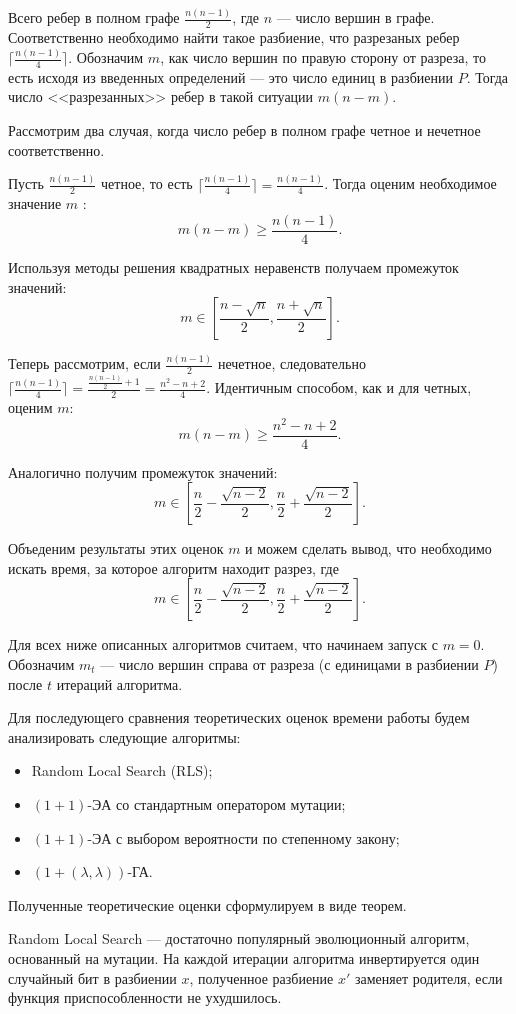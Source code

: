 \documentclass[times]{itmo-student-thesis}
\newcommand{\alglambdaf}{${(1 + (\lambda , \lambda))}$-ГА\xspace}
\newcommand{\oea}{\mbox{$(1 + 1)$-ЭА}\xspace}
\begin{document}
Всего ребер в полном графе $\frac{n(n-1)}{2}$, где $n$ --- число вершин в графе.
Соответственно необходимо найти такое разбиение, что разрезаных ребер $\lceil \frac{n(n-1)}{4} \rceil$.
Обозначим $m$, как число вершин по правую сторону от разреза, то есть исходя из введенных определений --- это число единиц в разбиении $P$.
Тогда число <<разрезанных>> ребер в такой ситуации $m(n-m)$.

Рассмотрим два случая, когда число ребер в полном графе четное и нечетное соответственно.

Пусть $\frac{n(n-1)}{2}$ четное, то есть $\lceil \frac{n(n-1)}{4} \rceil = \frac{n(n-1)}{4}$.
Тогда оценим необходимое значение $m$ :
$$
  m(n-m) \ge \frac{n(n-1)}{4}.
$$

Используя методы решения квадратных неравенств получаем промежуток значений:
$$
m \in \left[\frac{n - \sqrt{n}}{2}, \frac{n + \sqrt{n}}{2}\right].
$$

Теперь рассмотрим, если $\frac{n(n-1)}{2}$ нечетное, следовательно $\lceil \frac{n(n-1)}{4} \rceil = \frac{\frac{n(n-1)}{2}+1}{2} = \frac{n^2-n+2}{4}$.
Идентичным способом, как и для четных, оценим $m$:
$$
  m(n-m) \ge \frac{n^2-n+2}{4}.
$$

Аналогично получим промежуток значений:
$$
m \in \left[\frac{n}{2} -\frac{\sqrt{n-2}}{2},  \frac{n}{2} + \frac{\sqrt{n-2}}{2}\right].
$$

Объеденим результаты этих оценок $m$ и можем сделать вывод, что необходимо искать время, за которое алгоритм находит разрез, где
$$
m \in \left[\frac{n}{2} -\frac{\sqrt{n-2}}{2},  \frac{n}{2} + \frac{\sqrt{n-2}}{2}\right].
$$

Для всех ниже описанных алгоритмов считаем, что начинаем запуск с $m = 0$. Обозначим $m_t$ --- число вершин справа от разреза (с единицами в разбиении $P$) после $t$ итераций алгоритма.

Для последующего сравнения теоретических оценок времени работы будем анализировать следующие алгоритмы:
\begin{itemize}
  \item Random Local Search (RLS);
  \item \oea со стандартным оператором мутации;
  \item \oea с выбором вероятности по степенному закону;
  \item \alglambdaf.
\end{itemize}

Полученные теоретические оценки сформулируем в виде теорем.

Random Local Search --- достаточно популярный эволюционный алгоритм, основанный на мутации. На каждой итерации алгоритма инвертируется один случайный бит в разбиении $x$, полученное разбиение $x'$ заменяет родителя, если функция приспособленности не ухудшилось.
\end{document}
